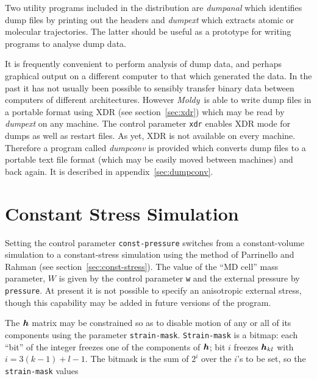 \documentclass[twoside]{report}
\newcommand{\moldy}{{\em Moldy}}
\newcommand{\bm}[1]{\mbox{\boldmath \protect\(#1\protect\)}}
\begin{document}
Two utility programs included in the distribution are {\em
dumpanal\/} which identifies dump files by printing out the headers
and {\em dumpext\/} which extracts atomic or molecular
trajectories.  The latter should be useful as a prototype for writing
programs to analyse dump data.

It is frequently convenient to perform analysis of dump data, and
perhaps graphical output on a different computer to that which
generated the data.  In the past it has not usually been possible to
sensibly transfer binary data between computers of different
architectures.  However \moldy\ is able to write dump files in a
portable format using XDR (see section~\ref{sec:xdr}) which may be
read by {\em dumpext\/} on any machine.  The control parameter
\texttt{xdr} enables XDR mode for dumps as well as restart files.
As yet, XDR is not available on every machine.  Therefore a program
called {\em dumpconv\/} is provided which converts dump files to a
portable text file format (which may be easily moved between machines)
and back again. It is described in appendix~\ref{sec:dumpconv}.


\section{Constant Stress Simulation}%

Setting  the control parameter   \texttt{const-pressure} switches from a
constant-volume  simulation to a con\-stant-stress  simulation using the
method     of    Parrinello     and    Rahman\cite{parrinello:81}   (see
section~\ref{sec:const-stress}).   The value of  the  ``MD cell'' mass
parameter,  $W$  is given by the control  parameter \texttt{w}  and  the
external pressure by \texttt{pressure}. At present it is not possible to
specify an anisotropic external stress, though this  capability may be
added in future versions of the program.

\label{sec:cp-constraints}
The $\bm{h}$ matrix may be constrained so as to disable motion of any
or all of its components using the parameter \texttt{strain-mask}. 
\texttt{Strain-mask} is a bitmap: each ``bit'' of the integer
freezes one of the components of $\bm{h}$;
bit $i$ freezes $ \bm{h}_{kl}$ with 
$ i = 3 (k\!-\!1)\! +\! l\! -\!1$.
The bitmask is the sum of $2^i$ over the $i$'s to be set, so the
\texttt{strain-mask} values
\end{document}

